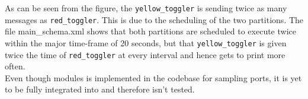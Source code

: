 As can be seen from the figure, the \texttt{yellow\_toggler} is sending twice as
many messages as \texttt{red\_toggler}. This is due to the scheduling of the two
partitions. The file main\_schema.xml shows that both partitions are
scheduled to execute twice within the major time-frame of 20 seconds, but that
\texttt{yellow\_toggler} is given twice the time of \texttt{red\_toggler} at
every interval and hence gets to print more often.\\

Even though modules is implemented in the codebase for sampling ports, it is yet
to be fully integrated into \OSname{} and therefore isn't tested.
